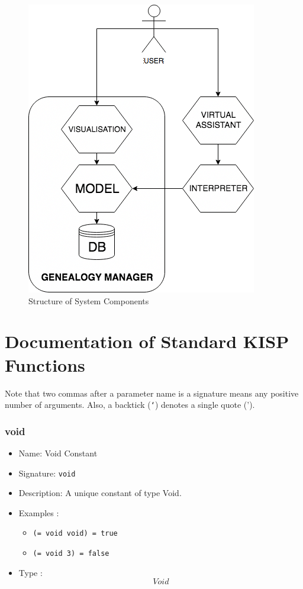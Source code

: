 \begin{figure}
    \centering
    \includegraphics[width=\linewidth]{figs/structure.png}
    \caption{Structure of System Components}
    \label{fig:struct}
\end{figure}

\chapter{Documentation of Standard KISP Functions}
\label{chap:doc}
Note that two commas after a parameter name is a signature means any positive number of arguments. Also, a backtick (\texttt{`})
denotes a single quote (').

\subsection{void}
\begin{itemize}
    \item Name: Void Constant
    \item Signature: \texttt{void}
    \item Description: A unique constant of type Void.
    \item Examples :
        \begin{itemize}
            \item \texttt{(= void void) = true}
            \item \texttt{(= void 3) = false}
        \end{itemize}
    \item Type : \[Void\]
\end{itemize}

